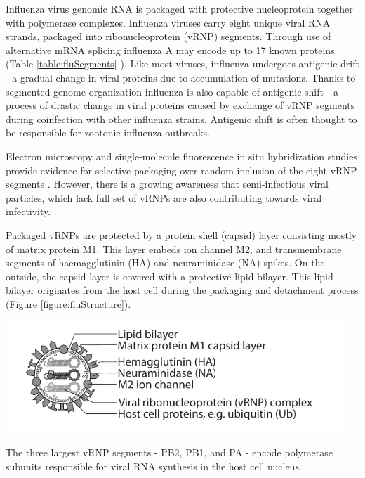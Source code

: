 Influenza virus genomic RNA is packaged with protective nucleoprotein together with polymerase complexes. Influenza viruses carry eight unique viral RNA strands, packaged into ribonucleoprotein  (vRNP) segments. Through use of alternative mRNA splicing influenza A may encode up to 17 known proteins (Table \ref{table:fluSegments} \cite{das2010structures, dubois2014influenza}). Like most viruses, influenza undergoes antigenic drift - a gradual change in viral proteins due to accumulation of mutations. Thanks to segmented genome organization influenza is also capable of antigenic shift - a process of drastic change in viral proteins caused by exchange of vRNP segments during coinfection with other influenza strains. Antigenic shift is often thought to be responsible for zootonic influenza outbreaks.

Electron microscopy and single‑molecule fluorescence in situ hybridization studies provide evidence for selective packaging over random inclusion of the eight vRNP segments \cite{eisfeld2015centre}. However, there is a growing awareness that semi-infectious viral particles, which lack full set of vRNPs are also contributing towards viral infectivity.

Packaged vRNPs are protected by a protein shell (capsid) layer consisting mostly of matrix protein M1. This layer embeds ion channel M2, and transmembrane segments of haemagglutinin (HA) and neuraminidase (NA) spikes. On the outside, the capsid layer is covered with a protective lipid bilayer. This lipid bilayer originates from the host cell during the packaging and detachment process (Figure \ref{figure:fluStructure}).

\begin{center}
\includegraphics[width=0.95\textwidth, trim={0cm 0cm 0cm 0cm}, clip]{D_chapters/0_introduction/flu_structure.pdf}
\label{figure:fluStructure}
\end{center}

The three largest vRNP segments - PB2, PB1, and PA - encode polymerase subunits responsible for viral RNA synthesis in the host cell nucleus.

